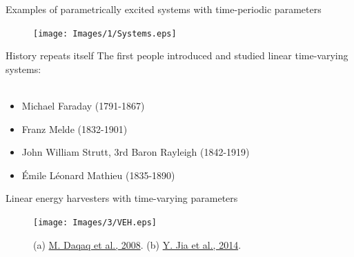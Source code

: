 \documentclass[LaTeX2e,10pt]{beamer}
\begin{document}
\begin{frame}{Examples of parametrically excited systems with time-periodic parameters}
\begin{figure}
	\centering
	\texttt{[image: Images/1/Systems.eps]}
\end{figure}
\end{frame}
\begin{frame}{History repeats itself}
The first people introduced and studied linear time-varying systems:\\~\\
\begin{itemize}
\setlength\itemsep{0.6cm}
	  \item Michael Faraday (1791-1867)
    \item Franz Melde (1832-1901)
    \item John William Strutt, 3rd Baron Rayleigh (1842-1919)
    \item \'Emile L\'eonard Mathieu (1835-1890)
\end{itemize}
\end{frame}
\begin{frame}{Linear energy harvesters with time-varying parameters}
		\begin{figure}
		\texttt{[image: Images/3/VEH.eps]}
		\caption{(a) \href{http://journals.sagepub.com/doi/abs/10.1177/1045389X08100978}{M. Daqaq et al., 2008}. (b) \href{https://www.sciencedirect.com/science/article/pii/S0924424714004075}{Y. Jia et al., 2014}.} 
	\end{figure}
\end{frame}
\end{document}
